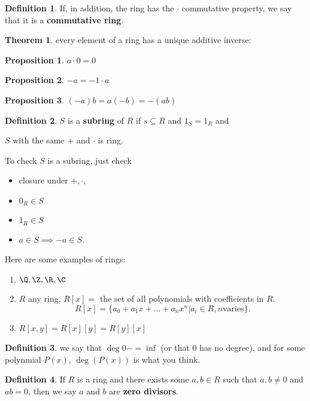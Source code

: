 \documentclass[a5paper]{article}
\theoremstyle{definition}%
\newtheorem*{theorem*}{Theorem} %
\newtheorem*{proposition*}{Proposition}
\newtheorem*{definition*}{Definition}
\numberwithin{exercise}{section}
\theoremstyle{remark}%
\begin{document}
\begin{definition*}
If, in addition, the ring has the $\cdot$ commutative property, we say that it is a \textbf{commutative ring}. 
\end{definition*}

\begin{theorem*}
every element of a ring has a unique additive inverse:
\end{theorem*}

\begin{proposition*}
$a\cdot 0 = 0$
\end{proposition*}

\begin{proposition*}
$-a = -1\cdot a$
\end{proposition*}

\begin{proposition*}
$(-a)b=a(-b)=-(ab)$
\end{proposition*}

\begin{definition*}
$S$ is a \textbf{subring} of $R$ if $s\subseteq R$ and $1_S=1_R$ and 

$S$ with the same $+$ and $\cdot$ is ring.
\end{definition*}
To check $S$ is a subring, just check 
\begin{itemize}
\item closure under $+, \cdot$, 
\item $0_R \in S$
\item $1_R \in S$
\item $a\in S \implies -a \in S$. 
\end{itemize}

Here are some examples of rings: 

\begin{enumerate}
\item $ \Q, \Z, \R, \C$
\item $ R$ any ring, $R[x]=$ the set of all polynomials with coefficients in $R$. 
$$R[x]=\{a_0+a_1x+\dots+a_nx^n | a_i\in R, n \text{varies}\}.$$
\item $R[x,y]=R[x][y]=R[y][x]$
\end{enumerate}

\begin{definition*}
we say that $\deg 0 -=\inf$  (or that 0 has no degree), and for some polynmial $P(x)$, $\deg(P(x))$ is what you think. 
\end{definition*}

\begin{definition*}
If $R$ is a ring and there exists some $a,b\in R$ such that $a,b\neq0$ and $ab=0$, then we say $a$ and $b$ are \textbf{zero divisors}. 
\end{definition*}
\end{document}
